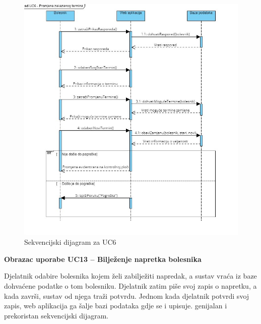 \begin{figure}[h!]
    \centering
    \includegraphics[width=\textwidth]{./slike/Sekvencijski - UC6.jpg} 
    \caption{Sekvencijski dijagram za UC6}
    \label{fig:my_image}
\end{figure}
\eject

\textbf{Obrazac uporabe UC13 – Bilježenje napretka bolesnika}

Djelatnik odabire bolesnika kojem želi zabilježiti napredak, a sustav vraća iz baze dohvaćene podatke o tom bolesniku. Djelatnik zatim piše svoj zapis o napretku, a kada završi, sustav od njega traži potvrdu. Jednom kada djelatnik potvrdi svoj zapis, web aplikacija ga šalje bazi podataka gdje se i upisuje.
genijalan i prekoristan sekvencijski dijagram.

